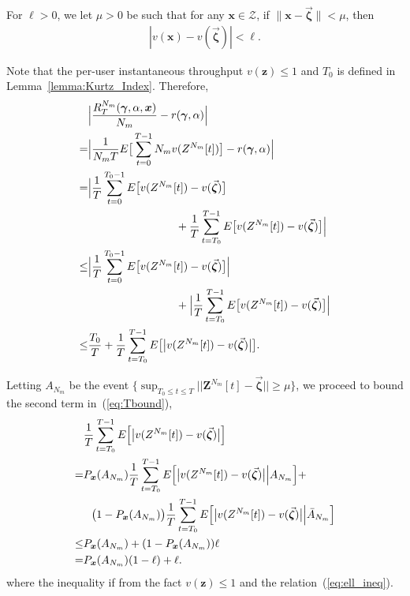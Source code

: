 \documentclass[11pt,twocolumn]{IEEEtran}
\begin{document}
For $\ell>0$, we let $\mu>0$ be such that for any $\bm x\in \mathcal{Z}$, if $\|\bm x -\vec{\bm \zeta} \|<\mu$, then
\begin{align}
|v(\bm x)-v(\vec{\bm \zeta})|<\ell. \label{eq:ell_ineq}
\end{align}

Note that the per-user instantaneous throughput $v(\bm z)\leq 1$ and $T_0$ is defined in Lemma~\ref{lemma:Kurtz_Index}. Therefore,
\begin{align}
&\Big| \frac{R_{T}^{{N_m}}(\bm \gamma, \alpha, \bm x)}{N_m}-r(\bm \gamma, \alpha)\Big|\nonumber\\
=&\Big | \frac{1}{{N_m} T}E\big[\sum_{t=0}^{T-1} N_m v(Z^{N_m}[t])\big]-r(\bm \gamma, \alpha)\Big| \nonumber \\
=&\Big| \frac{1}{T}\sum_{t=0}^{T_0-1} E\big[v(Z^{N_m}[t])-v(\vec{\bm \zeta})\big]\nonumber\\
&\hspace{1.1in}+\frac{1}{T}\sum_{t=T_0}^{T-1}E \big[v(Z^{N_m}[t])-v(\vec{\bm \zeta})\big]\Big| \nonumber \\
\leq&  \Big| \frac{1}{T}\sum_{t=0}^{T_0-1} E\big[v(Z^{N_m}[t])-v(\vec{\bm \zeta})\big] \Big|\nonumber\\
&\hspace{1.1in}+\Big |  \frac{1}{T}\sum_{t=T_0}^{T-1}E \big[v(Z^{N_m}[t])-v(\vec{\bm \zeta})\big]\Big| \nonumber \\
\leq&  \frac{T_0}{T}+\frac{1}{T}\sum_{t=T_0}^{T-1}E\big[\big | v(Z^{N_m}[t])-v(\vec{\bm \zeta})\big| \big]. \label{eq:Tbound}
\end{align}

Letting $A_{N_m}$ be the event $\{\sup_{T_0 \leq t \leq T} ||\bm Z^{N_m}[t]-\vec{\bm \zeta} || \geq \mu\}$, we proceed to bound the second term in~(\ref{eq:Tbound}),
\begin{align}
&\frac{1}{T}\sum_{t=T_0}^{T-1}E\Big[ \big | v(Z^{N_m}[t])-v(\vec{\bm \zeta})\big| \Big ]\nonumber \\
=&P_{\bm x}(A_{N_m}) \frac{1}{T}\sum_{t=T_0}^{T-1}E\Big[ \big | v(Z^{N_m}[t])-v(\vec{\bm \zeta})\big| \Big | A_{N_m} \Big]+\nonumber\\
&\hspace{0.1in} \big(1-P_{\bm x}(A_{N_m})\big) \frac{1}{T}\sum_{t=T_0}^{T-1}E\Big[ \big | v(Z^{N_m}[t])-v(\vec{\bm \zeta})\big| \Big | \bar{A}_{N_m} \Big] \nonumber \\
\leq&  P_{\bm x}(A_{N_m})+ (1-P_{\bm x}(A_{N_m}))\ell \nonumber \\
=& P_{\bm x}(A_{N_m})(1-\ell) +\ell .\nonumber
\end{align}
where the inequality if from the fact $v(\bm z)\leq 1$ and the relation~(\ref{eq:ell_ineq}).
\end{document}
